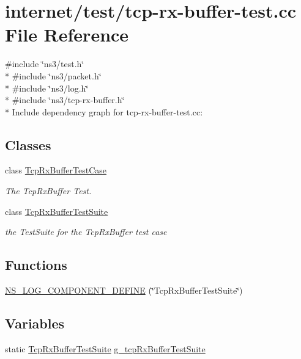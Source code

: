 \hypertarget{tcp-rx-buffer-test_8cc}{}\section{internet/test/tcp-\/rx-\/buffer-\/test.cc File Reference}
\label{tcp-rx-buffer-test_8cc}
{\ttfamily \#include \char`\"{}ns3/test.\+h\char`\"{}}\\*
{\ttfamily \#include \char`\"{}ns3/packet.\+h\char`\"{}}\\*
{\ttfamily \#include \char`\"{}ns3/log.\+h\char`\"{}}\\*
{\ttfamily \#include \char`\"{}ns3/tcp-\/rx-\/buffer.\+h\char`\"{}}\\*
Include dependency graph for tcp-\/rx-\/buffer-\/test.cc\+:
\subsection*{Classes}
\begin{DoxyCompactItemize}
\item 
class \hyperlink{classTcpRxBufferTestCase}{Tcp\+Rx\+Buffer\+Test\+Case}
\begin{DoxyCompactList}\small\item\em The Tcp\+Rx\+Buffer Test. \end{DoxyCompactList}\item 
class \hyperlink{classTcpRxBufferTestSuite}{Tcp\+Rx\+Buffer\+Test\+Suite}
\begin{DoxyCompactList}\small\item\em the Test\+Suite for the Tcp\+Rx\+Buffer test case \end{DoxyCompactList}\end{DoxyCompactItemize}
\subsection*{Functions}
\begin{DoxyCompactItemize}
\item 
\hyperlink{tcp-rx-buffer-test_8cc_a272101eb5ee974bd6d99cc529b2635a9}{N\+S\+\_\+\+L\+O\+G\+\_\+\+C\+O\+M\+P\+O\+N\+E\+N\+T\+\_\+\+D\+E\+F\+I\+NE} (\char`\"{}Tcp\+Rx\+Buffer\+Test\+Suite\char`\"{})
\end{DoxyCompactItemize}
\subsection*{Variables}
\begin{DoxyCompactItemize}
\item 
static \hyperlink{classTcpRxBufferTestSuite}{Tcp\+Rx\+Buffer\+Test\+Suite} \hyperlink{tcp-rx-buffer-test_8cc_a84d2cba60a7fe94e3f932f278248b0ee}{g\+\_\+tcp\+Rx\+Buffer\+Test\+Suite}
\end{DoxyCompactItemize}


